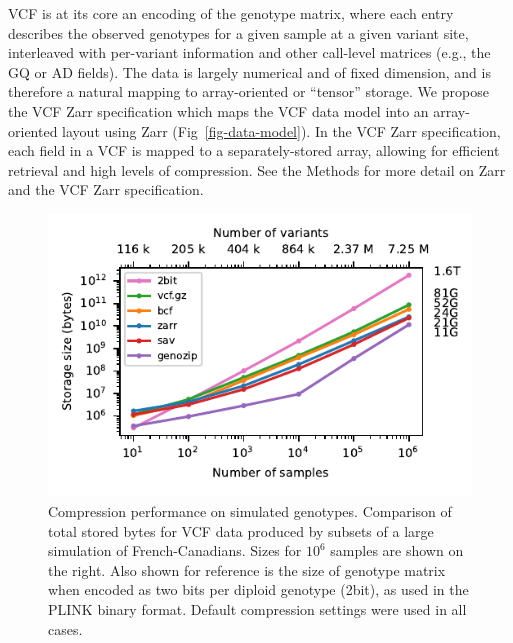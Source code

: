 \documentclass[a4paper,num-refs]{oup-contemporary}
\begin{document}
VCF is at its core an encoding of the genotype matrix, where each entry
describes the observed genotypes for a given sample at a given variant site,
interleaved with per-variant information
and other call-level matrices (e.g., the GQ or AD fields).
The data is largely numerical and of fixed dimension,
and is therefore a natural mapping to array-oriented
or ``tensor'' storage.
We propose the VCF Zarr specification which maps the
VCF data model into an array-oriented layout using Zarr
(Fig~\ref{fig-data-model}).
In the VCF Zarr specification,
each field in a VCF is mapped to a separately-stored array,
allowing for efficient retrieval and
high levels of compression.
See the Methods for more detail on Zarr and the VCF Zarr
specification.

\begin{figure}
\begin{center}
\includegraphics[]{figures/data-scaling}
\end{center}
\caption{Compression performance on simulated genotypes.
Comparison of total stored bytes for VCF data produced
by subsets of a large simulation of French-Canadians.
Sizes for $10^6$ samples are shown on the right.
Also shown for reference is the size of genotype matrix
when encoded as two bits per diploid genotype (2bit), as used
in the PLINK binary format. Default compression settings were
used in all cases.
\label{fig-data-storage}}
\end{figure}
\end{document}

